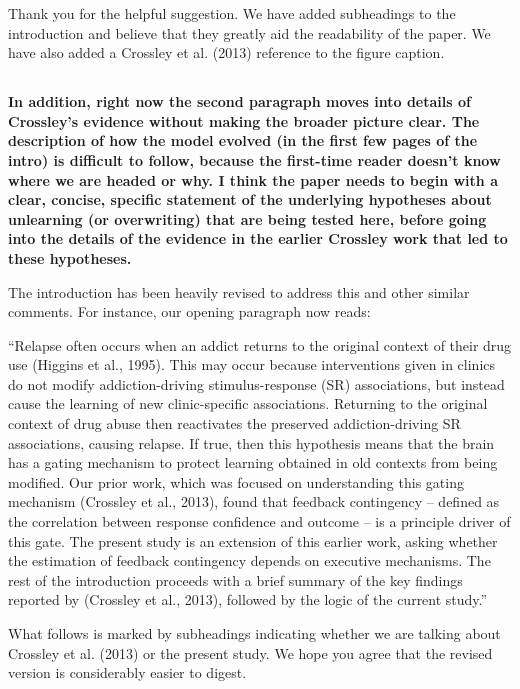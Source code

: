 \documentclass[10pt,a4paper]{article} \usepackage{amsmath} \usepackage{parskip}
\begin{document}
Thank you for the helpful suggestion. We have added subheadings to the
introduction and believe that they greatly aid the readability of the paper. We
have also added a Crossley et al. (2013) reference to the figure caption.

\subsection{} \textbf{
  In addition, right now the second paragraph moves into details of Crossley's
  evidence without making the broader picture clear. The description of how the
  model evolved (in the first few pages of the intro) is difficult to follow,
  because the first-time reader doesn't know where we are headed or why. I think
  the paper needs to begin with a clear, concise, specific statement of the
  underlying hypotheses about unlearning (or overwriting) that are being tested
  here, before going into the details of the evidence in the earlier Crossley work
  that led to these hypotheses.
}

The introduction has been heavily revised to address this and other similar
comments. For instance, our opening paragraph now reads:

``Relapse often occurs when an addict returns to the original context of their
drug use (Higgins et al., 1995). This may occur because interventions given in
clinics do not modify addiction-driving stimulus-response (SR) associations, but
instead cause the learning of new clinic-specific associations. Returning to the
original context of drug abuse then reactivates the preserved addiction-driving
SR associations, causing relapse. If true, then this hypothesis means that the
brain has a gating mechanism to protect learning obtained in old contexts from
being modified. Our prior work, which was focused on understanding this gating
mechanism (Crossley et al., 2013), found that feedback contingency – defined as
the correlation between response confidence and outcome – is a principle driver
of this gate. The present study is an extension of this earlier work, asking
whether the estimation of feedback contingency depends on executive mechanisms.
The rest of the introduction proceeds with a brief summary of the key findings
reported by (Crossley et al., 2013), followed by the logic of the current
study.''

What follows is marked by subheadings indicating whether we are talking about
Crossley et al. (2013) or the present study. We hope you agree that the revised
version is considerably easier to digest.
\end{document}
